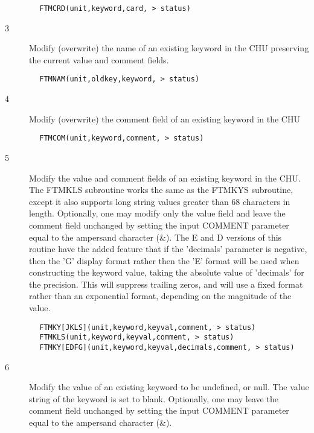 \documentclass[11pt]{book}
\begin{document}
\begin{verbatim}
        FTMCRD(unit,keyword,card, > status)
\end{verbatim}

\begin{description}
\item[3 ] Modify (overwrite) the name of an existing keyword in the CHU
   preserving the current value and comment fields.
\end{description}

\begin{verbatim}
        FTMNAM(unit,oldkey,keyword, > status)
\end{verbatim}

\begin{description}
\item[4 ] Modify (overwrite) the comment field of an existing keyword in the CHU
\end{description}

\begin{verbatim}
        FTMCOM(unit,keyword,comment, > status)
\end{verbatim}

\begin{description}
\item[5 ] Modify the value and comment fields of an existing keyword in the CHU.
    The FTMKLS subroutine works the same as the FTMKYS subroutine, except
    it also supports long string values greater than 68 characters in length.
    Optionally, one may modify only the value field and leave the comment
    field unchanged by setting the input COMMENT parameter equal to
    the ampersand character (\&).
     The E and D versions of this routine have the added feature that
     if the 'decimals' parameter is negative, then the 'G' display
     format rather then the 'E' format will be used when constructing
     the keyword value, taking the absolute value of 'decimals' for the
     precision.  This will suppress trailing zeros, and will use a
     fixed format rather than an exponential format,
    depending on the magnitude of the value.
\end{description}

\begin{verbatim}
        FTMKY[JKLS](unit,keyword,keyval,comment, > status)
        FTMKLS(unit,keyword,keyval,comment, > status)
        FTMKY[EDFG](unit,keyword,keyval,decimals,comment, > status)
\end{verbatim}

\begin{description}
\item[6 ] Modify the value of an existing keyword to be undefined, or null.
    The value string of the keyword is set to blank.
    Optionally, one may leave the comment field unchanged by setting the
   input COMMENT parameter equal to the ampersand character (\&).
\end{description}
\end{document}
